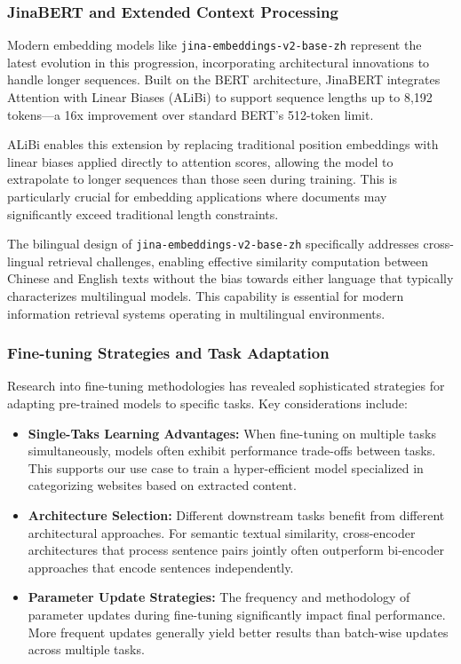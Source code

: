 \documentclass[
  titlepage]{article}
\begin{document}
\subsubsection{JinaBERT and Extended Context
Processing}\label{jinabert-and-extended-context-processing}

Modern embedding models like \texttt{jina-embeddings-v2-base-zh}
represent the latest evolution in this progression, incorporating
architectural innovations to handle longer sequences. Built on the BERT
architecture, JinaBERT integrates Attention with Linear Biases (ALiBi)
to support sequence lengths up to 8,192 tokens---a 16x improvement over
standard BERT's 512-token limit.

ALiBi enables this extension by replacing traditional position
embeddings with linear biases applied directly to attention scores,
allowing the model to extrapolate to longer sequences than those seen
during training. This is particularly crucial for embedding applications
where documents may significantly exceed traditional length constraints.

The bilingual design of \texttt{jina-embeddings-v2-base-zh} specifically
addresses cross-lingual retrieval challenges, enabling effective
similarity computation between Chinese and English texts without the
bias towards either language that typically characterizes multilingual
models. This capability is essential for modern information retrieval
systems operating in multilingual environments.

\subsubsection{Fine-tuning Strategies and Task
Adaptation}\label{fine-tuning-strategies-and-task-adaptation}

Research into fine-tuning methodologies has revealed sophisticated
strategies for adapting pre-trained models to specific tasks. Key
considerations include:

\begin{itemize}
\item
  \textbf{Single-Taks Learning Advantages:} When fine-tuning on multiple
  tasks simultaneously, models often exhibit performance trade-offs
  between tasks. This supports our use case to train a hyper-efficient
  model specialized in categorizing websites based on extracted content.
\item
  \textbf{Architecture Selection:} Different downstream tasks benefit
  from different architectural approaches. For semantic textual
  similarity, cross-encoder architectures that process sentence pairs
  jointly often outperform bi-encoder approaches that encode sentences
  independently.
\item
  \textbf{Parameter Update Strategies:} The frequency and methodology of
  parameter updates during fine-tuning significantly impact final
  performance. More frequent updates generally yield better results than
  batch-wise updates across multiple tasks.
\end{itemize}
\end{document}
